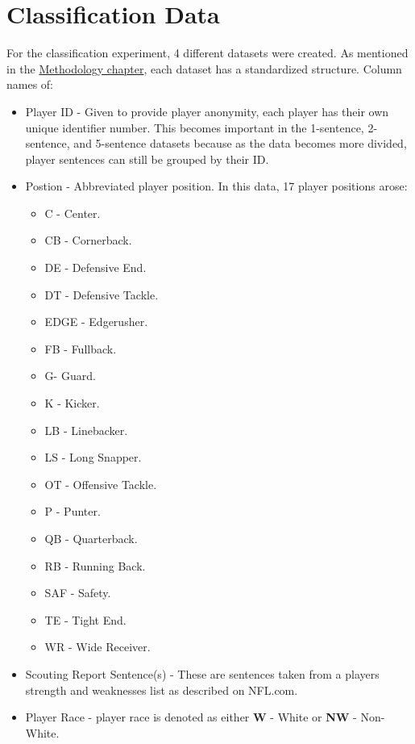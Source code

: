 \documentclass[oneside,12pt]{Classes/RoboticsLaTeX}
\begin{document}
\section{Classification Data}
\label{sec:class_data}
For the classification experiment, 4 different datasets were created. As mentioned in the \hyperref[chap:methodology]{Methodology chapter}, each dataset has a standardized structure. Column names of:
\begin{itemize}
  \item Player ID - Given to provide player anonymity, each player has their own unique identifier number. This becomes important in the 1-sentence, 2-sentence, and 5-sentence datasets because as the data becomes more divided, player sentences can
        still be grouped by their ID.
  \item Postion - Abbreviated player position. In this data, 17 player positions arose: \begin{itemize}
    \item C - Center.
    \item CB - Cornerback.
    \item DE - Defensive End.
    \item DT - Defensive Tackle.
    \item EDGE - Edgerusher.
    \item FB - Fullback.
    \item G- Guard.
    \item K - Kicker.
    \item LB - Linebacker.
    \item LS - Long Snapper.
    \item OT - Offensive Tackle.
    \item P - Punter.
    \item QB - Quarterback.
    \item RB - Running Back.
    \item SAF - Safety.
    \item TE - Tight End.
    \item WR - Wide Receiver.
  \end{itemize}
  \item Scouting Report Sentence(s) - These are sentences taken from a players strength and weaknesses list as described on NFL.com.
  \item Player Race - player race is denoted as either \textbf{W} - White or \textbf{NW} - Non-White.
\end{itemize}
\end{document}

